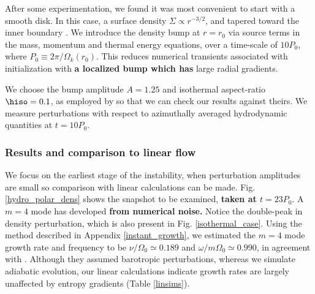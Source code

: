 
After some experimentation, we found it was most convenient to start with a smooth disk.
In this case, a surface density $\Sigma\propto r^{-3/2}$, and tapered toward 
the inner boundary \citep[as used in][]{lin12b}. We introduce 
the density bump at $r=r_0$ via source terms in the mass, momentum and thermal energy equations, over a time-scale of $10P_0$, 
where $P_0 \equiv 2\pi/\Omega_k(r_0) $. %
This reduces numerical transients associated with initialization with {\bf a localized bump which has} large radial gradients. 

We choose the bump amplitude $A=1.25$ 
and isothermal aspect-ratio $\hiso=0.1$, as employed by \cite{meheut12} so that we can check our results against theirs.  
We measure perturbations with respect to azimuthally averaged hydrodynamic quantities at $t=10P_0$. 


\subsubsection{Results and comparison to linear flow}
%
We focus on the earliest stage of the instability, when perturbation
amplitudes are small so comparison with linear calculations can be
made. Fig. \ref{hydro_polar_dens} shows the snapshot to be
examined, {\bf taken at $t=23P_0$}. A $m=4$ mode has developed {\bf
  from numerical noise.} Notice the double-peak in
density perturbation, which is also present in
Fig. \ref{isothermal_case}. Using the method described in Appendix
\ref{instant_growth}, we estimated the $m=4$ mode growth rate and
frequency to be $\nu/\Omega_0\simeq 0.189$ and
$\omega/m\Omega_0\simeq 0.990$, in agreement with \cite{meheut12}.
Although they assumed barotropic perturbations, 
whereas we simulate adiabatic evolution, our linear calculations
indicate growth rates are largely unaffected by entropy gradients (Table \ref{linsims}). 

